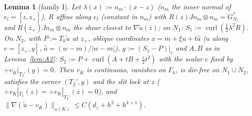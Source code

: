 \documentclass[11pt]{article}
\newtheorem{lemma}[theorem]{Lemma}
\theoremstyle{remark}
\newcommand{\norm}[1]{\|#1\|}
\newcommand{\curl}{\operatorname{curl}}
\begin{document}
\begin{lemma}[family I]\label{lem:A1}
Let $\lambda(x):=n_m\cdot(x-z)$ ($n_m$ the inner normal of $e_l=[z,z_+]$), $R$ affine along $e_l$ (constant in $n_m$) with $R(z)Jn_m\otimes n_m=G^*_{N_1}$
and $R(z_+)Jn_m\otimes n_m$ the shear closest to $\nabla\tilde u(z)$; on $N_1$: $S_1:=\curl(\frac12\lambda^2R)$. On $N_2$, with $P:=T_k\tilde u$ at $z_+$, oblique
coordinates $x=m+\xi u+t\hat a$ ($u$ along $e=[z_+,y]$, $\hat a=(w-m)/|w-m|$), $g:=(S_1-P)|_e$ and $A,B$ as in Lemma~\ref{lem:A2}:
$S_2:=P+\curl(A+tB+\frac c2t^2)$ with the scalar $c$ fixed by $\div v_K|_{T_2'}(y)=0$. Then $v_K$ is continuous, vanishes on $\Gamma_h$, is div-free on
$N_1\cup N_2$, satisfies the corner $(T_2',y)$ and the slit lock at $z$ ($\div v_K|_{T_1}(z)=\div v_K|_{T_2'}(z)=0$), and
$\norm{\nabla(\tilde u-v_K)}_{\omega(K)}\le C(d_z+h^2+h^{k+1})$.
\end{lemma}
\end{document}
